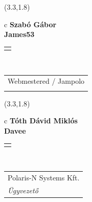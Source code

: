 \documentclass[11pt]{article}
\begin{document}
\makebox(3.3,1.8){
  \renewcommand\arraystretch{1.3}
  \begin{tabular}[c]{c}
    \hspace{8.5mm}
    \LARGE\bf{ Szabó Gábor }\\
    \hspace{8.5mm}
    \Large{ James53 }\\
    \renewcommand\arraystretch{3}
    \begin{tabular}[c]{c}
      \centering
      \fontfamily{phv}\selectfont{
        \textbf{
          \textsc{
            \scriptsize{
            \color{Bright}{ Ismerkedő }\color{Dark}{ Webmester }\color{Bright}{ Sminkmester }\color{Bright}{ Programozó }
            }
          }
        }
      }
    \end{tabular}
    \\
    \renewcommand\arraystretch{1}
    \begin{tabular}{p{3.3in}}
      \hspace{.7cm}Webmestered / Jampolo\\
      \hspace{.7cm}\emph{  }\\
    \end{tabular}
  \end{tabular}
}

\makebox(3.3,1.8){
  \renewcommand\arraystretch{1.3}
  \begin{tabular}[c]{c}
    \hspace{8.5mm}
    \LARGE\bf{ Tóth Dávid Miklós }\\
    \hspace{8.5mm}
    \Large{ Davee }\\
    \renewcommand\arraystretch{3}
    \begin{tabular}[c]{c}
      \centering
      \fontfamily{phv}\selectfont{
        \textbf{
          \textsc{
            \scriptsize{
            \color{Bright}{ Ismerkedő }\color{Dark}{ Webmester }\color{Dark}{ Sminkmester }\color{Dark}{ Programozó }
            }
          }
        }
      }
    \end{tabular}
    \\
    \renewcommand\arraystretch{1}
    \begin{tabular}{p{3.3in}}
      \hspace{.7cm}Polaris-N Systems Kft.\\
      \hspace{.7cm}\emph{ Ügyvezető }\\
    \end{tabular}
  \end{tabular}
}
\end{document}
